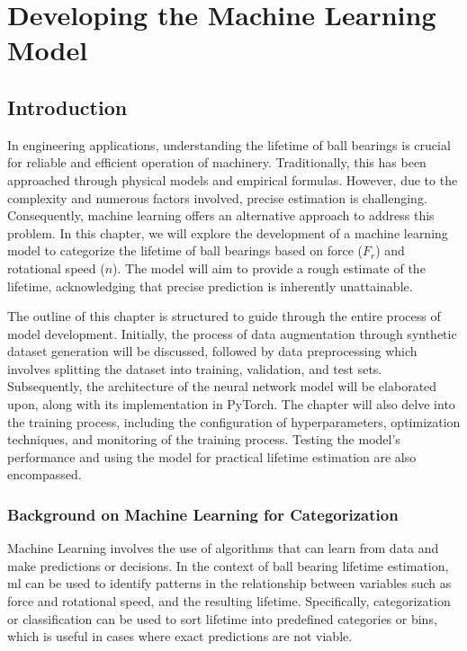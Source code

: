\chapter{Developing the Machine Learning Model}
\label{sec:bearings-model}

\section{Introduction}

In engineering applications, understanding the lifetime of ball bearings is crucial for reliable and efficient operation of machinery. Traditionally, this has been approached through physical models and empirical formulas. However, due to the complexity and numerous factors involved, precise estimation is challenging. Consequently, machine learning offers an alternative approach to address this problem. In this chapter, we will explore the development of a machine learning model to categorize the lifetime of ball bearings based on force (\(F_r\)) and rotational speed (\(n\)). The model will aim to provide a rough estimate of the lifetime, acknowledging that precise prediction is inherently unattainable.

The outline of this chapter is structured to guide through the entire process of model development. Initially, the process of data augmentation through synthetic dataset generation will be discussed, followed by data preprocessing which involves splitting the dataset into training, validation, and test sets. Subsequently, the architecture of the neural network model will be elaborated upon, along with its implementation in PyTorch. The chapter will also delve into the training process, including the configuration of hyperparameters, optimization techniques, and monitoring of the training process. Testing the model's performance and using the model for practical lifetime estimation are also encompassed.

\subsection*{Background on Machine Learning for Categorization}
Machine Learning involves the use of algorithms that can learn from data and make predictions or decisions. In the context of ball bearing lifetime estimation, \ac{ml} can be used to identify patterns in the relationship between variables such as force and rotational speed, and the resulting lifetime. Specifically, categorization or classification can be used to sort lifetime into predefined categories or bins, which is useful in cases where exact predictions are not viable.

